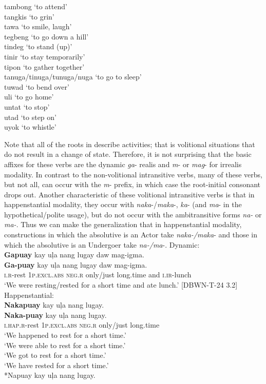 \begin{multicols}{2}
tambong ‘to attend’\\
tangkis ‘to grin’\\
tawa ‘to smile, laugh’\\
tegbeng ‘to go down a hill’\\
tindeg ‘to stand (up)’\\
tinir ‘to stay temporarily’\\
tipon ‘to gather together’\\
tanuga/tinuga/tunuga/nuga ‘to go to sleep’\\
tuwad ‘to bend over’\\
uli ‘to go home’\\
untat ‘to stop’\\
utad ‘to step on’\\
uyok ‘to whistle’\\
\end{multicols}
\z

Note that all of the roots in  describe activities; that is volitional situations that do not result in a change of state. Therefore, it is not surprising that the basic affixes for these verbs are the dynamic \textit{ga}{}- realis and \textit{m}{}- or \textit{mag}{}- for irrealis modality. In contrast to the non-volitional intransitive verbs, many of these verbs, but not all, can occur with the \textit{m}{}- prefix, in which case the root-initial consonant drops out. Another characteristic of these volitional intransitive verbs is that in happenstantial modality, they occur with  \textit{naka}{}-/\textit{maka}{}-, \textit{ka}{}- (and \textit{ma}{}-  in the hypothetical/polite usage), but do not occur with the ambitransitive forms \textit{na-} or \textit{ma-}. Thus we can make the generalization that in happenstantial modality, constructions in which the absolutive is an Actor take \textit{naka-/maka}{}- and those in which the absolutive is an Undergoer take \textit{na-/ma}{}-.
\ea
Dynamic: \\
\textbf{Gapuay}  kay  uļa  nang  lugay  daw  mag-igma. \\\smallskip
\gll  \textbf{Ga-puay}  kay  uļa  nang  lugay  daw  mag-igma. \\
\textsc{i.r}-rest  1\textsc{p.excl.abs}  \textsc{neg.r} only/just  long.time  and  \textsc{i.ir}-lunch \\
\glt ‘We were resting/rested for a short time and ate lunch.’ [DBWN-T-24 3.2]
\z
\ea
Happenstantial: \\
\textbf{Nakapuay}  kay  uļa  nang  lugay. \\\smallskip
\gll \textbf{Naka-puay}  kay  uļa  nang  lugay. \\
  \textsc{i.hap.r}-rest  1\textsc{p.excl.abs}  \textsc{neg.r} only/just  long.time \\
\glt  ‘We happened to rest for a short time.’ \\
  ‘We were able to rest for a short time.’ \\
  ‘We got to rest for a short time.’ \\
  ‘We have rested for a short time.’ \\\smallskip
  *Napuay kay uļa nang lugay.
\z

